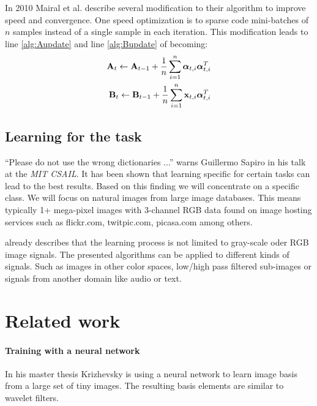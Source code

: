 In 2010 Mairal et al. \cite{Mairal2010} describe several modification to
their algorithm to improve speed and convergence. One speed optimization is to
sparse code mini-batches of $n$ samples instead of a single sample
in each iteration. This modification leads to line \ref{alg:Aupdate} and line
\ref{alg:Bupdate} of  becoming:
\begin{align*}
\boldsymbol{\mathrm{A}}_t \gets \boldsymbol{\mathrm{A}}_{t-1} +
\frac{1}{n}\sum_{i=1}^{n}\boldsymbol{\mathrm{\alpha}}_{t,i}\boldsymbol{\mathrm{\alpha}}_{t,i}^T\\
\boldsymbol{\mathrm{B}}_t \gets \boldsymbol{\mathrm{B}}_{t-1} +
\frac{1}{n}\sum_{i=1}^{n}\boldsymbol{\mathrm{x}}_{t,i}\boldsymbol{\mathrm{\alpha}}_{t,i}^T
\end{align*}

\subsection{Learning for the task}
\label{sec:learnForTheTask}
``Please do not use the wrong dictionaries ...''
warns Guillermo Sapiro in his talk at the \emph{MIT CSAIL}.
It has been shown that learning specific for certain tasks can lead to the
best results. Based on this finding we will concentrate on a
specific class. We will focus on natural images from large image databases.
This means typically 1+ mega-pixel images with 3-channel RGB data found on image
hosting services such as flickr.com, twitpic.com, picasa.com among others.

 already describes that the learning
process is not limited to gray-scale oder RGB image signals. The presented
algorithms can be applied to different kinds of signals. Such as images in
other color spaces, low/high pass filtered sub-images or signals from another
domain like audio or text. 


\section{Related work}
\label{sec:related_dictionarie}


\paragraph{Training with a neural network} In his master thesis 
Krizhevsky\cite{Krizhevsky2009} is using a neural network to learn image
basis from a large set of tiny images. The resulting basis elements are similar
to wavelet filters.

